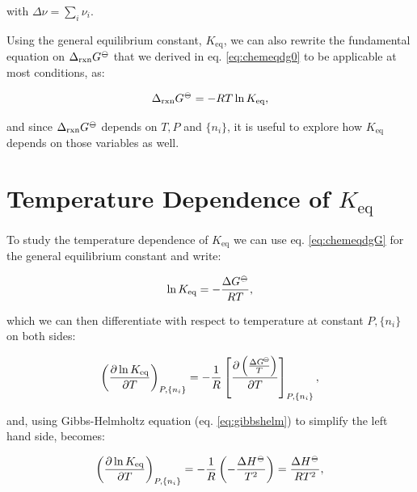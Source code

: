\documentclass[
  9pt,
]{extbook}
\theoremstyle{definition}
\theoremstyle{definition}
\theoremstyle{definition}
\theoremstyle{definition}
\theoremstyle{remark}
\begin{document}
with \(\Delta \nu =\sum_i \nu_i\).

Using the general equilibrium constant, \(K_{\text{eq}}\), we can also rewrite the fundamental equation on \(\Delta_{\text{rxn}} G^{-\kern-6pt{\ominus}\kern-6pt-}\) that we derived in eq. \eqref{eq:chemeqdg0} to be applicable at most conditions, as:

\begin{equation}
\Delta_{\text{rxn}} G^{-\kern-6pt{\ominus}\kern-6pt-}= - RT \ln K_{\text{eq}},
\label{eq:chemeqdgG}
\end{equation}

and since \(\Delta_{\text{rxn}} G^{-\kern-6pt{\ominus}\kern-6pt-}\) depends on \(T,P\) and \(\{n_i\}\), it is useful to explore how \(K_{\text{eq}}\) depends on those variables as well.

\section{\texorpdfstring{Temperature Dependence of \(K_{\text{eq}}\)}{Temperature Dependence of K\_\{\textbackslash text\{eq\}\}}}\label{temperature-dependence-of-k_texteq}

To study the temperature dependence of \(K_{\text{eq}}\) we can use eq. \eqref{eq:chemeqdgG} for the general equilibrium constant and write:

\begin{equation}
\ln K_{\text{eq}} = -\frac{\Delta G^{-\kern-6pt{\ominus}\kern-6pt-}}{RT},
\label{eq:kptemp1}
\end{equation}

which we can then differentiate with respect to temperature at constant \(P,\{n_i\}\) on both sides:

\begin{equation}
\left( \frac{\partial \ln K_{\text{eq}}}{\partial T} \right)_{P,\{n_i\}} = -\frac{1}{R}  \left[ \frac{\partial \left( \frac{\Delta G^{-\kern-6pt{\ominus}\kern-6pt-}}{T} \right)}{\partial T} \right]_{P,\{n_i\}},
\label{eq:kptemp2}
\end{equation}

and, using Gibbs-Helmholtz equation (eq. \eqref{eq:gibbshelm}) to simplify the left hand side, becomes:

\begin{equation}
\left( \frac{\partial \ln K_{\text{eq}}}{\partial T} \right)_{P,\{n_i\}} = -\frac{1}{R} \left( -\frac{\Delta H^{-\kern-6pt{\ominus}\kern-6pt-}}{T^2} \right) = \frac{\Delta H^{-\kern-6pt{\ominus}\kern-6pt-}}{RT^2},
\label{eq:kptemp3}
\end{equation}
\end{document}
